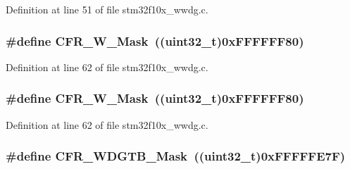 Definition at line 51 of file stm32f10x\+\_\+wwdg.\+c.

\subsubsection[{\texorpdfstring{C\+F\+R\+\_\+\+W\+\_\+\+Mask}{CFR_W_Mask}}]{\setlength{\rightskip}{0pt plus 5cm}\#define C\+F\+R\+\_\+\+W\+\_\+\+Mask~(({\bf uint32\+\_\+t})0x\+F\+F\+F\+F\+F\+F80)}\hypertarget{group___w_w_d_g___private___defines_gac00816db9fe6715f702b4f7d6085ce30}{}\label{group___w_w_d_g___private___defines_gac00816db9fe6715f702b4f7d6085ce30}


Definition at line 62 of file stm32f10x\+\_\+wwdg.\+c.

\subsubsection[{\texorpdfstring{C\+F\+R\+\_\+\+W\+\_\+\+Mask}{CFR_W_Mask}}]{\setlength{\rightskip}{0pt plus 5cm}\#define C\+F\+R\+\_\+\+W\+\_\+\+Mask~(({\bf uint32\+\_\+t})0x\+F\+F\+F\+F\+F\+F80)}\hypertarget{group___w_w_d_g___private___defines_gac00816db9fe6715f702b4f7d6085ce30}{}\label{group___w_w_d_g___private___defines_gac00816db9fe6715f702b4f7d6085ce30}


Definition at line 62 of file stm32f10x\+\_\+wwdg.\+c.

\subsubsection[{\texorpdfstring{C\+F\+R\+\_\+\+W\+D\+G\+T\+B\+\_\+\+Mask}{CFR_WDGTB_Mask}}]{\setlength{\rightskip}{0pt plus 5cm}\#define C\+F\+R\+\_\+\+W\+D\+G\+T\+B\+\_\+\+Mask~(({\bf uint32\+\_\+t})0x\+F\+F\+F\+F\+F\+E7\+F)}\hypertarget{group___w_w_d_g___private___defines_ga2b74f53d33f15b272b2d1ef78a78a2cc}{}\label{group___w_w_d_g___private___defines_ga2b74f53d33f15b272b2d1ef78a78a2cc}


